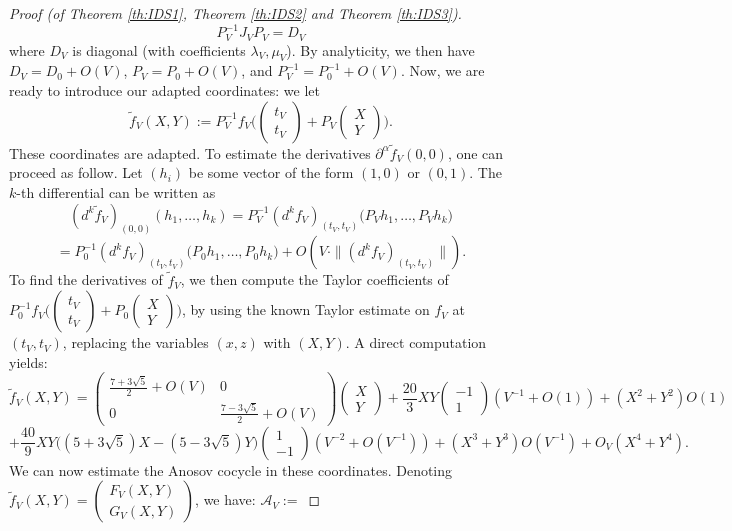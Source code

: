 \documentclass[10pt,a4paper]{amsart}
\begin{document}
\begin{proof}[Proof (of Theorem \ref{th:IDS1}, Theorem \ref{th:IDS2} and Theorem \ref{th:IDS3})]
$$ P_V^{-1} J_V P_V = D_V $$
where $D_V$ is diagonal (with coefficients $\lambda_V,\mu_V$). By analyticity, we then have $D_V = D_0 + O(V)$, $P_V=P_0 + O(V)$, and $P_V^{-1} = P_0^{-1} + O(V)$.
Now, we are ready to introduce our adapted coordinates: we let
$$ \tilde{f}_V(X,Y) := P_V^{-1} f_V\Big( \begin{pmatrix} t_V \\ t_V \end{pmatrix} + P_V \begin{pmatrix} X \\ Y \end{pmatrix} \Big). $$
These coordinates are adapted. To estimate the derivatives $\partial^\alpha \tilde{f}_V(0,0)$, one can proceed as follow. Let $(h_i)$ be some vector of the form $(1,0)$ or $(0,1)$. The $k$-th differential can be written as
$$ (d^k \tilde{f}_V)_{(0,0)}(h_1,\dots,h_k) = P_V^{-1} (d^{k}f_V)_{(t_V,t_V)}\Big( P_V h_1, \dots , P_V h_k \Big) $$
$$ = P_0^{-1} (d^{k}f_V)_{(t_V,t_V)}\Big( P_0 h_1, \dots , P_0 h_k \Big) + O(V \cdot \|(d^k f_V)_{(t_V,t_V)}\| ). $$
To find the derivatives of $\tilde{f}_V$, we then compute the Taylor coefficients of \\ $P_0^{-1} f_V\Big( \begin{pmatrix} t_V \\ t_V \end{pmatrix} + P_0 \begin{pmatrix} X \\ Y \end{pmatrix} \Big)$, by using the known Taylor estimate on $f_V$ at $(t_V,t_V)$, replacing the variables $(x,z)$ with $(X,Y)$. A direct computation yields:
$$ \tilde{f}_V(X,Y) = \begin{pmatrix} \frac{7+3\sqrt{5}}{2} + O(V) & 0 \\ 0 &  \frac{7-3\sqrt{5}}{2} + O(V) \end{pmatrix} \begin{pmatrix} X \\ Y \end{pmatrix} + \frac{20}{3} XY \begin{pmatrix} -1 \\ 1 \end{pmatrix} (V^{-1} + O(1)) + (X^2+Y^2) O(1) $$ $$+ \frac{40}{9} X Y \big( (5+3 \sqrt{5})X - (5-3 \sqrt{5})Y \big) \begin{pmatrix} 1 \\ -1 \end{pmatrix} (V^{-2} + O(V^{-1})) + (X^3+Y^3)O(V^{-1}) + O_V(X^4+Y^4) .$$
We can now estimate the Anosov cocycle in these coordinates. Denoting $\tilde{f}_V(X,Y) =  \begin{pmatrix} F_V(X,Y) \\ G_V(X,Y) \end{pmatrix}$, we have: $\mathcal{A}_V :=$ 

\end{proof}
\end{document}

